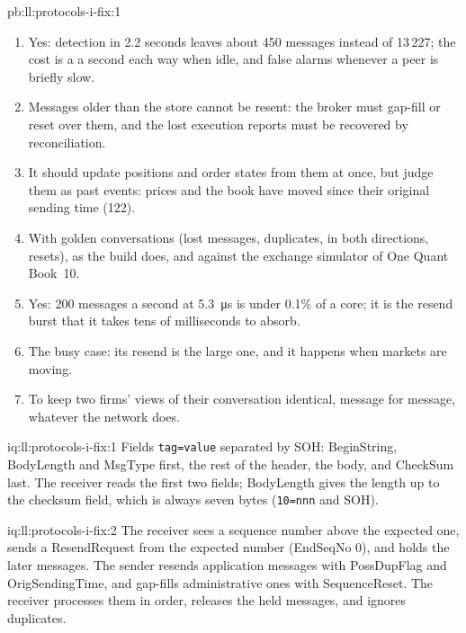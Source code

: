 \begin{solution}{pb:ll:protocols-i-fix:1}
\begin{enumerate}
not; a quiet 48-hour weekend leaves 5\,776 messages, which  reduces to 77, from \qty{42}{\milli\second} to
\qty{2.5}{\milli\second}.
\item Yes: detection in 2.2 seconds leaves about 450 messages instead of 13\,227; the cost is a  a second each way
when idle, and false alarms whenever a peer is briefly slow.
\item Messages older than the store cannot be resent: the broker must gap-fill or reset over them, and the lost execution
reports must be recovered by reconciliation.
\item It should update positions and order states from them at once, but judge them as past events: prices and the book have
moved since their original sending time (122).
\item With golden conversations (lost messages, duplicates,  in both directions, resets), as the build does,
and against the exchange simulator of One Quant Book~10.
\item Yes: 200 messages a second at \qty{5.3}{\micro\second} is under 0.1\% of a core; it is the resend burst that it takes
tens of milliseconds to absorb.
\item The busy case: its resend is the large one, and it happens when markets are moving.
\item To keep two firms' views of their conversation identical, message for message, whatever the network does.
\end{enumerate}
\end{solution}

\begin{solution}{iq:ll:protocols-i-fix:1}
Fields \texttt{tag=value} separated by SOH: BeginString, BodyLength and MsgType first, the rest of the header, the body, and
CheckSum last. The receiver reads the first two fields; BodyLength gives the length up to the checksum field, which is always
seven bytes (\texttt{10=nnn} and SOH).
\end{solution}

\begin{solution}{iq:ll:protocols-i-fix:2}
The receiver sees a sequence number above the expected one, sends a ResendRequest from the expected number (EndSeqNo 0), and
holds the later messages. The sender resends application messages with PossDupFlag and OrigSendingTime, and gap-fills
administrative ones with SequenceReset. The receiver processes them in order, releases the held messages, and ignores
duplicates.
\end{solution}

